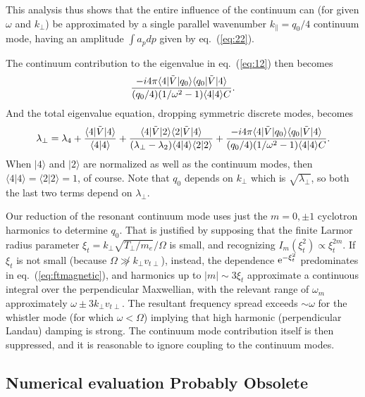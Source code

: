\documentclass[12pt]{article}
\def\ket#1{|#1\rangle}
\def\bra#1{\langle#1}
\def\etothe#1{{\rm e}^{#1}}
\begin{document}
This analysis thus shows that the entire influence of the continuum
can (for given $\omega$ and $k_\perp$) be approximated by a single
parallel wavenumber $k_\parallel= q_{0}/4$ continuum mode, having an
amplitude $\int a_p dp$ given by eq.\ (\ref{eq:22}).

The continuum contribution to the eigenvalue in eq.\ (\ref{eq:12}) then
becomes
\begin{equation}
  \label{eigcon}
  {-i4\pi\bra{4}|\tilde V \ket{q_{0}}\bra{q_{0}}|\tilde{V}\ket{4}
    \over
    (q_{0}/4)(1/\omega^2-1)\bra{4}\ket{4}C}\iffalse
  =
  {-i4\pi\bra{4}|\tilde V \ket{q_{0}}\bra{q_{0}}|\tilde{V}\ket{4}
    \over
    k_\parallel(1/\omega^2-1)\bra{4}\ket{4}C}\fi.
\end{equation}
And the total eigenvalue equation, dropping symmetric discrete modes, becomes
\begin{equation}
  \label{eigtotal}
  \lambda_\perp=\lambda_4+{\bra{4}|\tilde{V}\ket{4}\over
    \bra{4}\ket{4}}
    +{\bra{4}|\tilde{V}\ket{2}\bra{2}|\tilde{V}\ket{4}\over
      (\lambda_\perp-\lambda_2)\bra{4}\ket{4} \bra{2}\ket{2}}
    +%
    {-i4\pi\bra{4}|\tilde V \ket{q_{0}}\bra{q_{0}}|\tilde{V}\ket{4}
    \over
    (q_{0}/4)(1/\omega^2-1)\bra{4}\ket{4}C}.
\end{equation}
When $\ket{4}$ and $\ket{2}$ are normalized as well as the
continuum modes, then $\bra{4}\ket{4}=\bra{2}\ket{2}=1$, of
course. Note that $q_0$ depends on $k_\perp$ which is
$\sqrt{\lambda_\perp}$, so both the last two terms depend on
$\lambda_\perp$.

Our reduction of the resonant continuum mode uses just the $m=0,\pm 1$
cyclotron harmonics to determine $q_{0}.$ That is justified by
supposing that the finite Larmor radius parameter
$\xi_t=k_\perp\sqrt{T_\perp/m_e}/\Omega$ is small, and recognizing
$I_m(\xi_t^2)\propto \xi_t^{2m}$. If $\xi_t$ is not small (because
$\Omega\not\gg k_\perp v_{t\perp}$), instead, the dependence
$\etothe{-\xi_t^2}$ predominates in eq.\ (\ref{eq:ftmagnetic}), and
harmonics up to $|m|\sim 3\xi_t$ approximate a continuous integral
over the perpendicular Maxwellian, with the relevant range of
$\omega_m$ approximately $\omega\pm 3k_\perp v_{t\perp}$. The
resultant frequency spread exceeds $\sim\omega$ for the whistler mode
(for which $\omega < \Omega$) implying that high harmonic
(perpendicular Landau) damping is strong. The continuum mode
contribution itself is then suppressed, and it is reasonable to ignore
coupling to the continuum modes.

\subsection{Numerical evaluation Probably Obsolete}
\end{document}
